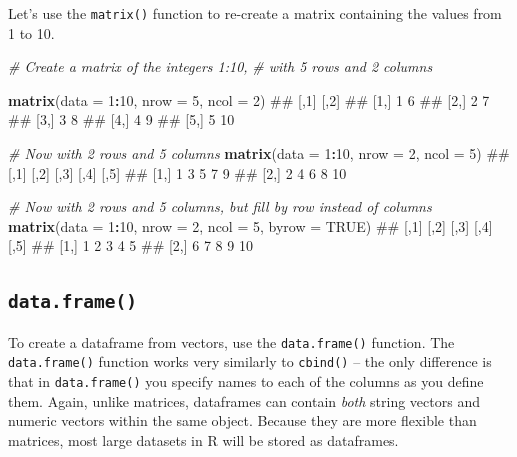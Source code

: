 \documentclass[]{book}
\newenvironment{Shaded}{\begin{snugshade}}{\end{snugshade}}
\newcommand{\KeywordTok}[1]{\textcolor[rgb]{0.13,0.29,0.53}{\textbf{#1}}}
\newcommand{\DataTypeTok}[1]{\textcolor[rgb]{0.13,0.29,0.53}{#1}}
\newcommand{\DecValTok}[1]{\textcolor[rgb]{0.00,0.00,0.81}{#1}}
\newcommand{\CommentTok}[1]{\textcolor[rgb]{0.56,0.35,0.01}{\textit{#1}}}
\newcommand{\OtherTok}[1]{\textcolor[rgb]{0.56,0.35,0.01}{#1}}
\newcommand{\OperatorTok}[1]{\textcolor[rgb]{0.81,0.36,0.00}{\textbf{#1}}}
\newcommand{\NormalTok}[1]{#1}
\theoremstyle{definition}
\theoremstyle{definition}
\theoremstyle{remark}
\begin{document}
Let's use the \texttt{matrix()} function to re-create a matrix
containing the values from 1 to 10.

\begin{Shaded}
\begin{Highlighting}[]
\CommentTok{# Create a matrix of the integers 1:10,}
\CommentTok{#  with 5 rows and 2 columns}

\KeywordTok{matrix}\NormalTok{(}\DataTypeTok{data =} \DecValTok{1}\OperatorTok{:}\DecValTok{10}\NormalTok{,}
       \DataTypeTok{nrow =} \DecValTok{5}\NormalTok{,}
       \DataTypeTok{ncol =} \DecValTok{2}\NormalTok{)}
\NormalTok{##      [,1] [,2]}
\NormalTok{## [1,]    1    6}
\NormalTok{## [2,]    2    7}
\NormalTok{## [3,]    3    8}
\NormalTok{## [4,]    4    9}
\NormalTok{## [5,]    5   10}

\CommentTok{# Now with 2 rows and 5 columns}
\KeywordTok{matrix}\NormalTok{(}\DataTypeTok{data =} \DecValTok{1}\OperatorTok{:}\DecValTok{10}\NormalTok{,}
       \DataTypeTok{nrow =} \DecValTok{2}\NormalTok{,}
       \DataTypeTok{ncol =} \DecValTok{5}\NormalTok{)}
\NormalTok{##      [,1] [,2] [,3] [,4] [,5]}
\NormalTok{## [1,]    1    3    5    7    9}
\NormalTok{## [2,]    2    4    6    8   10}

\CommentTok{# Now with 2 rows and 5 columns, but fill by row instead of columns}
\KeywordTok{matrix}\NormalTok{(}\DataTypeTok{data =} \DecValTok{1}\OperatorTok{:}\DecValTok{10}\NormalTok{,}
       \DataTypeTok{nrow =} \DecValTok{2}\NormalTok{,}
       \DataTypeTok{ncol =} \DecValTok{5}\NormalTok{,}
       \DataTypeTok{byrow =} \OtherTok{TRUE}\NormalTok{)}
\NormalTok{##      [,1] [,2] [,3] [,4] [,5]}
\NormalTok{## [1,]    1    2    3    4    5}
\NormalTok{## [2,]    6    7    8    9   10}
\end{Highlighting}
\end{Shaded}

\subsection{\texorpdfstring{\texttt{data.frame()}}{data.frame()}}\label{data.frame}

To create a dataframe from vectors, use the \texttt{data.frame()}
function. The \texttt{data.frame()} function works very similarly to
\texttt{cbind()} -- the only difference is that in \texttt{data.frame()}
you specify names to each of the columns as you define them. Again,
unlike matrices, dataframes can contain \emph{both} string vectors and
numeric vectors within the same object. Because they are more flexible
than matrices, most large datasets in R will be stored as dataframes.
\end{document}
